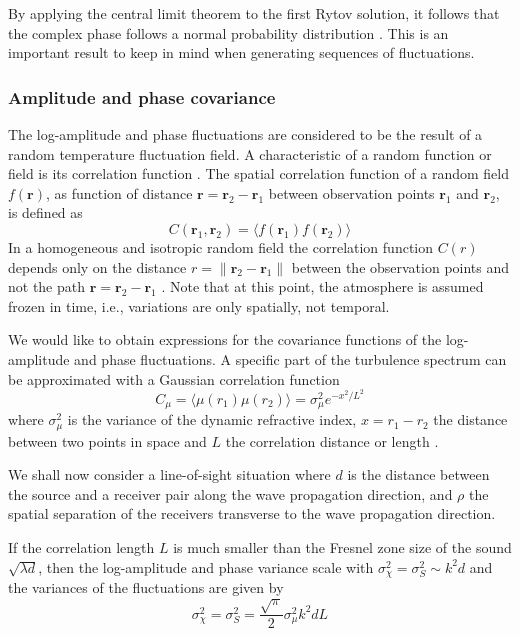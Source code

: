 By applying the central limit theorem to the first Rytov solution, it follows
that the complex phase follows a normal probability distribution
\cite{Jurado-navas2006}. This is an important result to keep in mind when
generating sequences of fluctuations.

\subsubsection*{Amplitude and phase covariance}
The log-amplitude and phase fluctuations are considered to be the result of a
random temperature fluctuation field. A characteristic of a random function or
field is its correlation function \cite{Tatarskii1971}. The spatial correlation
function of a random field $f(\mathbf{r})$, as function of distance $\mathbf{r}=\mathbf{r}_2-\mathbf{r}_1$
between observation points $\mathbf{r}_1$ and $\mathbf{r}_2$, is defined as
\begin{equation}
 C(\mathbf{r}_1, \mathbf{r}_2) = \langle f(\mathbf{r}_1)  f(\mathbf{r}_2) \rangle
\end{equation}
In a homogeneous and isotropic random field the correlation function $C(r)$
depends only on the distance $r = \lVert \mathbf{r}_2-\mathbf{r}_1 \rVert$
between the observation points and not the path
$\mathbf{r}=\mathbf{r}_2-\mathbf{r}_1$ \cite{Salomons2001}. Note that at this
point, the atmosphere is assumed frozen in time, i.e., variations are only
spatially, not temporal.

We would like to obtain expressions for the covariance functions of the
log-amplitude and phase fluctuations. A specific part of the turbulence spectrum
can be approximated with a Gaussian correlation function
\begin{equation}
 C_{\mu} = \langle \mu(r_1) \mu(r_2) \rangle = \sigma_{\mu}^2 e^{-x^2/L^2}
\end{equation}
where $\sigma_{\mu}^2$ is the variance of the dynamic refractive index,
$x=r_1-r_2$ the distance between two points in space and $L$ the correlation
distance or length \cite{Ishimaru1997}.

We shall now consider a line-of-sight situation where $d$ is the
distance between the source and a receiver pair along the wave propagation
direction, and $\rho$ the spatial separation of the receivers transverse to the
wave propagation direction.

If the correlation length $L$ is much smaller than the Fresnel zone size of the sound
$\sqrt{\lambda d}$, then the log-amplitude and phase variance scale with
$\sigma_{\chi}^2=\sigma_{S}^2 \sim k^2 d$
\cite{Ishimaru1997} and the variances of the fluctuations are given by \cite{Daigle1983}
\begin{equation}\label{eq:model_daigle}
 \sigma_{\chi}^2 = \sigma_{S}^2 = \frac{\sqrt{\pi}}{2} \sigma_{\mu}^2 k^2 d L
\end{equation}

